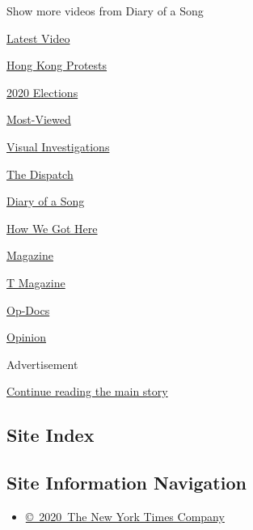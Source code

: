 Show more videos from Diary of a Song

\href{/video}{}

\href{/video/latest-video}{Latest Video}

\href{/video/hk-protest}{Hong Kong Protests}

\href{/video/2020-Elections}{2020 Elections}

\href{/video/Most-Viewed}{Most-Viewed}

\href{/video/investigations}{Visual Investigations}

\href{/video/on-the-ground}{The Dispatch}

\href{/video/diaryofasong}{Diary of a Song}

\href{/video/how-we-got-here}{How We Got Here}

\href{/video/magazine}{Magazine}

\href{/video/t-magazine}{T Magazine}

\href{/video/op-docs}{Op-Docs}

\href{/video/opinion}{Opinion}

Advertisement

\protect\hyperlink{after-bottom}{Continue reading the main story}

\hypertarget{site-index}{%
\subsection{Site Index}\label{site-index}}

\hypertarget{site-information-navigation}{%
\subsection{Site Information
Navigation}\label{site-information-navigation}}

\begin{itemize}
\tightlist
\item
  \href{https://help.nytimes3xbfgragh.onion/hc/en-us/articles/115014792127-Copyright-notice}{©~2020~The
  New York Times Company}
\end{itemize}

